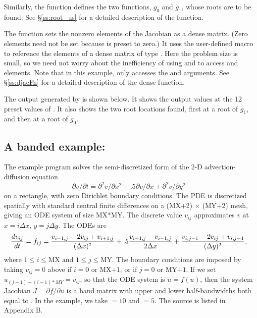 Similarly, the function  defines the two functions, $g_0$ and $g_1$,
whose roots are to be found.  See \S\ref{ss:root_us} for a detailed description
of the  function.

The function  sets the nonzero elements of the Jacobian as a
dense matrix.  (Zero elements need not be set because  is preset
to zero.)  It uses the user-defined macro  to reference the
elements of a dense matrix of type .  Here the problem
size is small, so we need not worry about the inefficiency of using
 and  to access  and
 elements.  Note that in this example, 
only accesses the  and  arguments.  See \S\ref{ss:djacFn}
for a detailed description of the dense  function.

The output generated by  is shown below.  It shows the output
values at the 12 preset values of .  It also shows the two root
locations found, first at a root of $g_1$, and then at a root of $g_0$.



\subsection{A banded example: }\label{ss:cvbx}

The example program  solves the semi-discretized form
of the 2-D advection-diffusion equation
\begin{equation}
\label{eq:adeqn}
\partial v / \partial t = \partial^2 v / \partial x^2
  + .5 \partial v / \partial x + \partial^2 v / \partial y^2
\end{equation}
on a rectangle, with zero Dirichlet boundary conditions. The PDE is 
discretized spatially with standard central finite differences 
on a (MX+2) $\times$ (MY+2) mesh, giving an ODE system of size MX*MY.  
The discrete value $v_{ij}$ approximates $v$ at $x = i \Delta x$,
$y = j \Delta y$. The ODEs are
\begin{equation}
\label{eq:cdiff}
{{dv_{ij}} \over dt} = f_{ij} =
         {{v_{i-1,j} - 2 v_{ij} + v_{i+1,j}} \over {(\Delta x)^2}}
       + .5  {{v_{i+1,j} - v_{i-1,j}} \over {2 \Delta x}}
       + {{v_{i,j-1} - 2 v_{ij} + v_{i,j+1}} \over {(\Delta y)^2}},
\end{equation}
where $1 \leq i \leq $MX and $1 \leq j \leq $MY.  The boundary
conditions are imposed by taking $v_{ij} = 0$ above if $i = 0$
or MX$+1$, or if $j = 0$ or MY$+1$. 
If we set $u_{(j-1)+(i-1)*MY} = v_{ij}$, so that the ODE system is
$\dot{u} = f(u)$, then the system Jacobian $J = \partial f / \partial u$ is
a band matrix with upper and lower half-bandwidths both equal to .
In the example, we take  $= 10$ and  $= 5$.
The source is listed in Appendix B.

